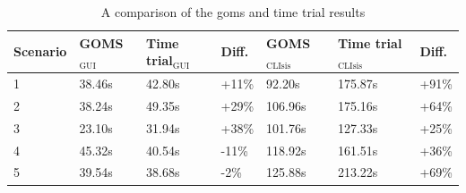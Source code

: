 \begin{table}[h]
	\center
	
	\begin{tabular}{lllllll}
		\toprule
		Scenario		&	GOMS$_{\text{GUI}}$	& Time trial$_{\text{GUI}}$	& Diff. & GOMS$_{\text{CLIsis}}$	& Time trial$_{\text{CLIsis}}$	& Diff. \\		
		\midrule
		1	&	38.46s						& 42.80s							& +11\%					& 92.20s						& 175.87s							& +91\% \\
		2	& 38.24s						& 49.35s							& +29\%					& 106.96s					& 175.16s							& +64\% \\
		3	& 23.10s						& 31.94s							& +38\%					& 101.76s					& 127.33s							&	+25\%\\
		4	& 45.32s						& 40.54s							& -11\%					& 118.92s					& 161.51s							&	+36\%\\
		5	& 39.54s						& 38.68s							& -2\%						& 125.88s					& 213.22s							& +69\%\\
		\bottomrule
	\end{tabular}
	\caption{A comparison of the \acrshort{goms} and time trial results}
	\label{table:gomstimetrialcomparison}
\end{table}
